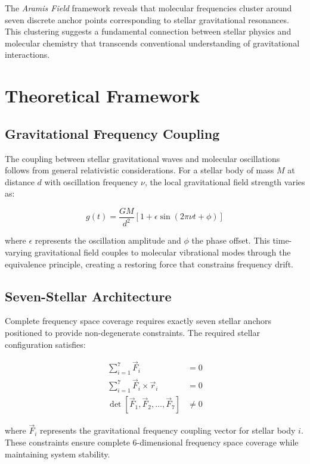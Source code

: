 \documentclass[twocolumn,showpacs,preprintnumbers,amsmath,amssymb]{revtex4-2}
\newcommand{\aramis}{\textit{Aramis Field}}
\begin{document}
The \aramis{} framework \cite{russell_aramis_2025} reveals that molecular frequencies cluster around seven discrete anchor points corresponding to stellar gravitational resonances. This clustering suggests a fundamental connection between stellar physics and molecular chemistry that transcends conventional understanding of gravitational interactions.

\section{Theoretical Framework}

\subsection{Gravitational Frequency Coupling}

The coupling between stellar gravitational waves and molecular oscillations follows from general relativistic considerations. For a stellar body of mass $M$ at distance $d$ with oscillation frequency $\nu$, the local gravitational field strength varies as:

\begin{equation}
g(t) = \frac{GM}{d^2}\left[1 + \epsilon \sin(2\pi\nu t + \phi)\right]
\end{equation}

where $\epsilon$ represents the oscillation amplitude and $\phi$ the phase offset. This time-varying gravitational field couples to molecular vibrational modes through the equivalence principle, creating a restoring force that constrains frequency drift.

\subsection{Seven-Stellar Architecture}

Complete frequency space coverage requires exactly seven stellar anchors positioned to provide non-degenerate constraints. The required stellar configuration satisfies:

\begin{align}
\sum_{i=1}^{7} \vec{F}_i &= 0 \\
\sum_{i=1}^{7} \vec{F}_i \times \vec{r}_i &= 0 \\
\det[\vec{F}_1, \vec{F}_2, \ldots, \vec{F}_7] &\neq 0
\end{align}

where $\vec{F}_i$ represents the gravitational frequency coupling vector for stellar body $i$. These constraints ensure complete 6-dimensional frequency space coverage while maintaining system stability.
\end{document}
